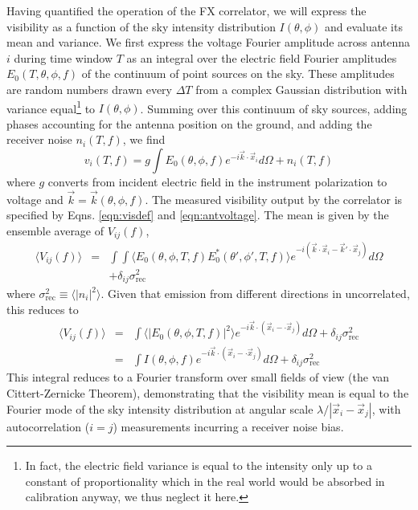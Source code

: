 Having quantified the operation of the FX correlator, we will express the visibility as a function of the sky intensity distribution $I(\theta,\phi)$ and evaluate its mean and variance. We first express the voltage Fourier amplitude across antenna $i$ during time window $T$ as an integral over the electric field Fourier amplitudes $E_0(T,\theta,\phi,f)$ of the continuum of point sources on the sky. These amplitudes are random numbers drawn every $\Delta T$ from a complex Gaussian distribution with variance equal\footnote{In fact, the electric field variance is equal to the intensity only up to a constant of proportionality which in the real world would be absorbed in calibration anyway, we thus neglect it here.} to $I(\theta,\phi)$. Summing over this continuum of sky sources, adding phases accounting for the antenna position on the ground, and adding the receiver noise $n_i(T,f)$, we find
\begin{equation}
\label{eqn:antvoltage}
v_i(T,f) = g\int E_0(\theta,\phi,f)e^{-i\vec{k}\cdot \vec{x}_i}d\Omega+n_i(T,f)
\end{equation}
where $g$ converts from incident electric field in the instrument polarization to voltage and $\vec{k}=\vec{k}(\theta,\phi,f)$. The measured visibility output by the correlator is specified by Eqns. \ref{eqn:visdef} and \ref{eqn:antvoltage}. The mean is given by the ensemble average of $V_{ij}(f)$,
\begin{eqnarray}
\langle V_{ij}(f)\rangle &=&\int\int \langle E_0(\theta,\phi,T,f)E_0^*(\theta',\phi',T,f)\rangle e^{-i(\vec{k}\cdot\vec{x}_i-\vec{k}'\cdot\vec{x}_j)}d\Omega \nonumber \\ 
&&+\delta_{ij}\sigma_\text{rec}^2
\end{eqnarray}
where $\sigma_\text{rec}^2\equiv\langle |n_i|^2\rangle$. Given that emission from different directions in uncorrelated, this reduces to 
\begin{eqnarray}
\langle V_{ij}(f)\rangle &=&\int\langle |E_0(\theta,\phi,T,f)|^2\rangle e^{-i\vec{k}\cdot(\vec{x}_i-\cdot\vec{x}_j)}d\Omega+\delta_{ij}\sigma_\text{rec}^2 \\
&=&\int I(\theta,\phi,f) e^{-i\vec{k}\cdot(\vec{x}_i-\cdot\vec{x}_j)}d\Omega+\delta_{ij}\sigma_\text{rec}^2 
\end{eqnarray}
This integral reduces to a Fourier transform over small fields of view (the van Cittert-Zernicke Theorem), demonstrating that the visibility mean is equal to the Fourier mode of the sky intensity distribution at angular scale $\lambda/|\vec{x}_i-\vec{x}_j|$, with autocorrelation ($i=j$) measurements incurring a receiver noise bias.

